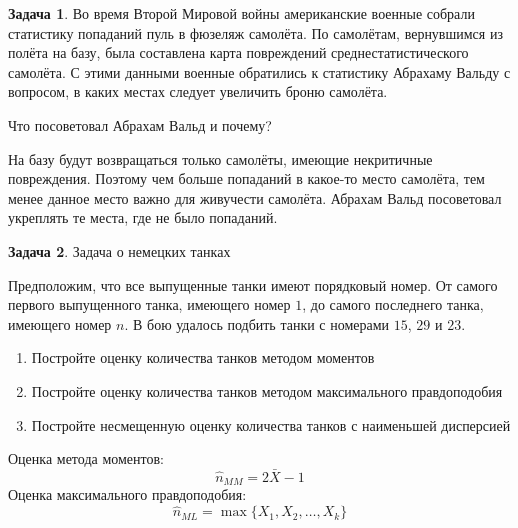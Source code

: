 \documentclass[nobib]{tufte-handout}
\theoremstyle{definition}
\newtheorem{problem}{Задача}
\begin{document}
\begin{problem}
Во время Второй Мировой войны американские военные собрали статистику попаданий пуль в фюзеляж самолёта.  По самолётам, вернувшимся из полёта на базу, была составлена карта повреждений среднестатистического самолёта. С этими данными военные обратились к статистику Абрахаму Вальду с вопросом, в каких местах следует увеличить броню самолёта.

Что посоветовал Абрахам Вальд и почему?

\begin{sol}
На базу будут возвращаться только самолёты, имеющие некритичные повреждения. Поэтому чем больше попаданий в какое-то место самолёта, тем менее данное место важно для живучести самолёта. Абрахам Вальд посоветовал укреплять те места, где не было попаданий.
\end{sol}

\end{problem}


\begin{problem}
Задача о немецких танках

Предположим, что все выпущенные танки имеют порядковый номер. От самого первого выпущенного танка, имеющего номер $1$, до самого последнего танка, имеющего номер $n$. В бою удалось подбить танки с номерами $15$, $29$ и $23$.

\begin{enumerate}
\item Постройте оценку количества танков методом моментов
\item Постройте оценку количества танков методом максимального правдоподобия
\item Постройте несмещенную оценку количества танков с наименьшей дисперсией
\end{enumerate}

\begin{sol}
Оценка метода моментов:
\[
\hat{n}_{MM}=2\bar{X}-1
\]
Оценка максимального правдоподобия:
\[
\hat{n}_{ML}=\max\{X_1,X_2, \ldots, X_k\}
\]

\end{sol}

\end{problem}
\end{document}
